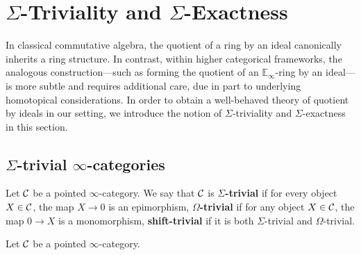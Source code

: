 \documentclass[10pt,a4paper,oneside]{article}
\begin{document}
\section{$\Sigma$-Triviality and $\Sigma$-Exactness}\label{sec:sigma}
In classical commutative algebra, the quotient of a ring by an ideal canonically inherits a ring structure. In contrast, within higher categorical frameworks, the analogous construction---such as forming the quotient of an $\mathbb{E}_\infty$-ring by an ideal---is more subtle and requires additional care, due in part to underlying homotopical considerations. In order to obtain a well-behaved theory of quotient by ideals in our setting, we introduce the notion of $\Sigma$-triviality and $\Sigma$-exactness in this section.

\subsection{$\Sigma$-trivial $\infty$-categories}

\begin{de}\label{de:Sigma-trivial}
Let $\mathcal{C}$ be a pointed $\infty$-category. We say that $\mathcal{C}$ is \textbf{$\Sigma$-trivial} if for every object $X\in\mathcal{C}$, the map $X\to0$ is an epimorphism, \textbf{$\Omega$-trivial} if for any object $X\in\mathcal{C}$, the map $0\to X$ is a monomorphism, \textbf{shift-trivial} if it is both $\Sigma$-trivial and $\Omega$-trivial.
\end{de}

\begin{rem}\label{sigtriveqshtriv}
Let $\mathcal{C}$ be a pointed $\infty$-category.
\end{rem}
\end{document}
